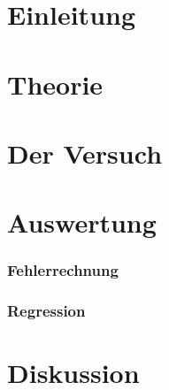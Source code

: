 \documentclass[a4,11pt]{article}
\newcommand{\V}{V500}
\begin{document}



\tableofcontents
\clearpage


\section{Einleitung}



\section{Theorie}

\clearpage


\section{Der Versuch}

\clearpage


\section{Auswertung}
\subsubsection{Fehlerrechnung}
\label{sec:Fehlerrechnung}

\subsubsection{Regression}
\label{sec:regression}

\clearpage

\clearpage


\section{Diskussion}


\clearpage
\listoffigures
\listoftables
\clearpage
\nocite{\V}
\printbibliography[title = Literaturverzeichnis]
\end{document}
